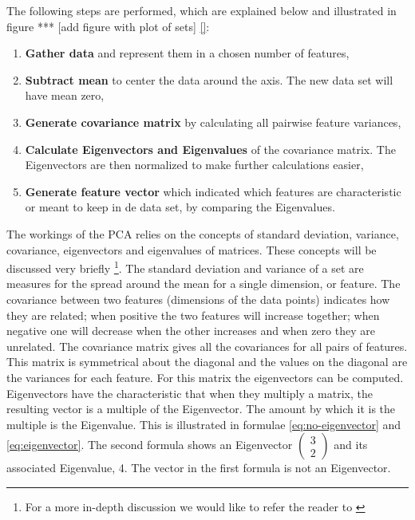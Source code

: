 The following steps are performed, which are explained below and illustrated 
in figure *** [add figure with plot of sets] \ref{}:
\begin{enumerate}
	\item \textbf{Gather data} and represent them in a chosen number of 
	features,
	\item \textbf{Subtract mean} to center the data around the axis. The new 
	data set will have mean zero,
	\item \textbf{Generate covariance matrix} by calculating all pairwise 
	feature variances,
	\item \textbf{Calculate Eigenvectors and Eigenvalues} of the covariance 
	matrix. The Eigenvectors are then normalized to make further calculations 
	easier,
	\item \textbf{Generate feature vector} which indicated which features are 
	characteristic or meant to keep in de data set, by comparing the 
	Eigenvalues. 
\end{enumerate}

The workings of the PCA \cite{smith2002tutorial} relies on the concepts of 
standard deviation, variance,
covariance, eigenvectors and eigenvalues of matrices. These concepts will be 
discussed very briefly \footnote{For a more in-depth discussion we would like 
to refer the reader to \cite{jolliffe2005principal}}. The standard deviation 
and variance
of a set are measures for the 
spread around the mean for a single dimension, or feature. The covariance 
between two features (dimensions of the data points) indicates how they are 
related; when positive the two 
features will increase together; when negative one will decrease when the 
other increases and when zero they are unrelated. The covariance matrix gives 
all the covariances for all pairs of features. This matrix is symmetrical 
about the diagonal and the values on the diagonal are the variances for each 
feature. For this matrix the eigenvectors can be computed. Eigenvectors have 
the characteristic that when they multiply a matrix, the resulting vector is a 
multiple of the Eigenvector. The amount by which it is the multiple is the 
Eigenvalue. This is illustrated in formulae \ref{eq:no-eigenvector} and 
\ref{eq:eigenvector}. The second formula shows an Eigenvector 
$ \left( \begin{smallmatrix} 
3 \\ 2 \end{smallmatrix} \right)$ and its 
associated Eigenvalue, 4. The vector in the first formula is not an 
Eigenvector. 

